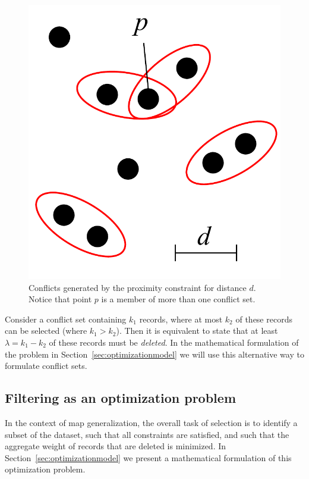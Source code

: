 \begin{figure}[htbp]
\begin{center}
\includegraphics[scale=.3]{figs/cvl_proximity_conflicts.pdf}
\caption{Conflicts generated by the proximity constraint for distance $d$. Notice that point $p$ is a member of more than one conflict set.}
\label{fig:proximity:conflict}
\end{center}
\end{figure}


Consider a conflict set containing $k_1$ records, where at most $k_2$ of these records can be selected (where $k_1 > k_2$). Then it is equivalent to state that at least $\lambda = k_1 - k_2$ of these records must be \emph{deleted}. In the mathematical formulation of the problem in Section~\ref{sec:optimizationmodel} we will use this alternative way to formulate conflict sets.

\subsection{Filtering as an optimization problem}
\label{sec:filtering}

In the context of map generalization, the overall task of selection is to identify a subset of the dataset, such that all constraints are satisfied, and such that the aggregate weight of records that are deleted is minimized. In Section~\ref{sec:optimizationmodel} we present a mathematical formulation of this optimization problem.

